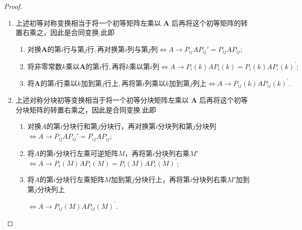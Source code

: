 \documentclass[../../main.tex]{subfiles}%
\begin{document}
\begin{proof}
\begin{enumerate}
\item 上述初等对称变换相当于将一个初等矩阵左乘以 $\boldsymbol{A}$ 后再将这个初等矩阵的转置右乘之，因此是合同变换.此即
\begin{enumerate}[(1)]
\item $\text{对换}\boldsymbol{A}\text{的第}i\text{行与第}j\text{行},\text{再对换第}i\text{列与第}j\text{列} \iff A\rightarrow P_{ij}AP_{ij}'=P_{ij}AP_{ij};$

\item $\text{将非零常数}k\text{乘以}\boldsymbol{A}\text{的第}i\text{行},\text{再将}k\text{乘以第}i\text{列}\Longleftrightarrow A\rightarrow P_i\left( k \right) AP_{i}\left( k \right)= P_i\left( k \right) AP_{i}\left( k \right)^{\prime};$

\item $\text{将}\boldsymbol{A}\text{的第}i\text{行乘以}k\text{加到第}j\text{行上},\text{再将第}i\text{列乘以}k\text{加到第}j\text{列上}\Longleftrightarrow A\rightarrow P_{ij}\left( k \right) AP_{ij}\left( k \right)^{\prime} .$
\end{enumerate}

\item 上述对称分块初等变换相当于将一个初等分块矩阵左乘以 $\boldsymbol{A}$ 后再将这个初等分块矩阵的转置右乘之，因此是合同变换.此即
\begin{enumerate}[(1)]
\item 对换\(A\)的第\(i\)分块行和第\(j\)分块行，再对换第\(i\)分块列和第\(j\)分块列$\iff A\rightarrow P_{ij}AP_{ij}'=P_{ij}AP_{ij};$

\item 将\(A\)的第\(i\)分块行左乘可逆矩阵\(M\)，再将第\(i\)分块列右乘\(M'\)$\Longleftrightarrow A\rightarrow P_i\left( M \right) AP_{i}\left( M \right)= P_i\left( M \right) AP_{i}\left( M \right)^{\prime};$

\item 将\(A\)的第\(i\)分块行左乘矩阵\(M\)加到第\(j\)分块行上，再将第\(i\)分块列右乘\(M'\)加到第\(j\)分块列上

$\Longleftrightarrow A\rightarrow P_{ij}\left( M \right) AP_{ij}\left( M \right)^{\prime} .$
\end{enumerate}
\end{enumerate}

\end{proof}
\end{document}
